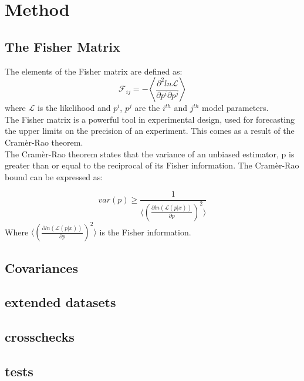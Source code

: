 
\section{Method}
\subsection{The Fisher Matrix}
The elements of the Fisher matrix are defined as:
\begin{equation}
\mathcal{F}_{ij} = - \left \langle \frac{\partial^{2}ln{\mathcal{L}}}{\partial p^i\partial p^j } \right \rangle
\end{equation}
where $\mathcal{L}$ is the likelihood and $p^{i}$, $p^{j}$ are the $i^{th}$ and $j^{th}$ model parameters.
\\
The Fisher matrix is a powerful tool in experimental design, used for forecasting the upper limits on the precision of an experiment. This comes as a result of the Cram\`{e}r-Rao theorem.
\\
The Cram\`{e}r-Rao theorem states that the variance of an unbiased estimator, p is greater than or equal to the reciprocal of its Fisher information. The Cram\`{e}r-Rao bound can be expressed as:

\begin{equation}
var(p) \geq \frac{1}{\langle (\frac{\partial ln(\mathcal{L}(p \vert x))}{\partial p})^2 \rangle}
\end{equation}
Where $\langle (\frac{\partial ln(\mathcal{L}(p \vert x))}{\partial p})^2 \rangle$ is the Fisher information.

\subsection{Covariances}
\subsection{extended datasets}
\subsection{crosschecks}
\subsection{tests}
